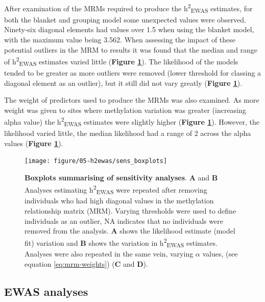 \documentclass[11pt,twoside]{bristolthesis}
\begin{document}
After examination of the MRMs required to produce the h\textsuperscript{2}\textsubscript{EWAS} estimates, for both the blanket and grouping model some unexpected values were observed. Ninety-six diagonal elements had values over 1.5 when using the blanket model, with the maximum value being 3.562. When assessing the impact of these potential outliers in the MRM to results it was found that the median and range of h\textsuperscript{2}\textsubscript{EWAS} estimates varied little (\textbf{Figure \ref{fig:h2ewas-sens}}). The likelihood of the models tended to be greater as more outliers were removed (lower threshold for classing a diagonal element as an outlier), but it still did not vary greatly (\textbf{Figure \ref{fig:h2ewas-sens}}).

The weight of predictors used to produce the MRMs was also examined. As more weight was given to sites where methylation variation was greater (increasing alpha value) the h\textsuperscript{2}\textsubscript{EWAS} estimates were slightly higher (\textbf{Figure \ref{fig:h2ewas-sens}}). However, the likelihood varied little, the median likelihood had a range of 2 across the alpha values (\textbf{Figure \ref{fig:h2ewas-sens}}).




\begin{figure}[!htp]

{\centering \texttt{[image: figure/05-h2ewas/sens\_boxplots]} 

}

\caption[Boxplots summarising of sensitivity analyses]{\textbf{Boxplots summarising of sensitivity analyses}. \textbf{A} and \textbf{B} Analyses estimating h\textsuperscript{2}\textsubscript{EWAS} were repeated after removing individuals who had high diagonal values in the methylation relationship matrix (MRM). Varying thresholds were used to define individuals as an outlier, NA indicates that no individuals were removed from the analysis. \textbf{A} shows the likelihood estimate (model fit) variation and \textbf{B} shows the variation in h\textsuperscript{2}\textsubscript{EWAS} estimates. Analyses were also repeated in the same vein, varying \(\alpha\) values, (see equation \eqref{eq:mrm-weights}) (\textbf{C} and \textbf{D}).}\label{fig:h2ewas-sens}
\end{figure}
\hypertarget{results-ewas-analyses-05}{%
\subsection{EWAS analyses}\label{results-ewas-analyses-05}}
\end{document}
